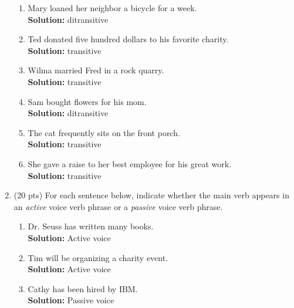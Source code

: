 \documentclass[11pt]{article}
\begin{document}
\begin{enumerate}
\begin{enumerate}
\item Mary loaned her neighbor a bicycle for a week.  \\
\textbf{Solution:} ditransitive\\

\item Ted donated five hundred dollars to his favorite charity. \\
\textbf{Solution:} transitive\\

\item Wilma married Fred in a rock quarry.  \\
\textbf{Solution:} transitive\\

\item Sam bought flowers for his mom. \\
\textbf{Solution:} ditransitive\\

\item The cat frequently sits on the front porch. \\
\textbf{Solution:} transitive\\

\item She gave a raise to her best employee for his great work.  \\
\textbf{Solution:} transitive\\

\end{enumerate}


\newpage
\item (20 pts) For each sentence below, indicate whether the main verb
  appears in an {\it active} voice verb phrase or a {\it passive}
  voice verb phrase. 

\begin{enumerate}

\item Dr. Seuss has written many books. \\
\textbf{Solution:} Active voice\\

\item Tim will be organizing a charity event. \\
\textbf{Solution:} Active voice\\

\item Cathy has been hired by IBM. \\
\textbf{Solution:} Passive voice\\


\end{enumerate}
\end{enumerate}
\end{document}
